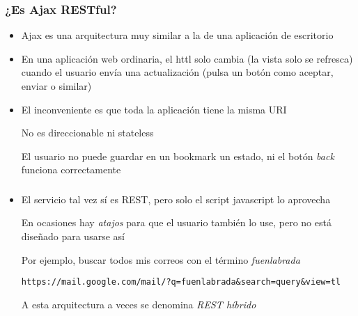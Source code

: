 \documentclass[ucs]{beamer}
\begin{document}
\begin{frame}[fragile]
\frametitle{¿Es Ajax RESTful?}

\begin{itemize}
\item
Ajax es una arquitectura muy similar a la de una aplicación de escritorio
\item

En una aplicación web ordinaria, el httl solo cambia (la vista solo se refresca) cuando el usuario envía
una actualización (pulsa un botón como aceptar, enviar o similar)

\item

El inconveniente es que toda la aplicación tiene la misma URI

No es direccionable ni stateless

El usuario no puede guardar en un bookmark un estado, ni el botón \emph{back} funciona correctamente

\end{itemize}
\end{frame}
\begin{frame}[fragile]
\frametitle{}
\begin{itemize}
\item
El servicio tal vez sí es REST, pero solo el script javascript lo aprovecha

En ocasiones hay \emph{atajos} para que el usuario también lo use, pero no está
diseñado para usarse así

Por ejemplo, buscar todos mis correos con el término \emph{fuenlabrada}
  \begin{footnotesize}
  \begin{verbatim}
https://mail.google.com/mail/?q=fuenlabrada&search=query&view=tl
  \end{verbatim}
  \end{footnotesize}

A esta arquitectura a veces se denomina \emph{REST híbrido}

\end{itemize}

\end{frame}
\end{document}
